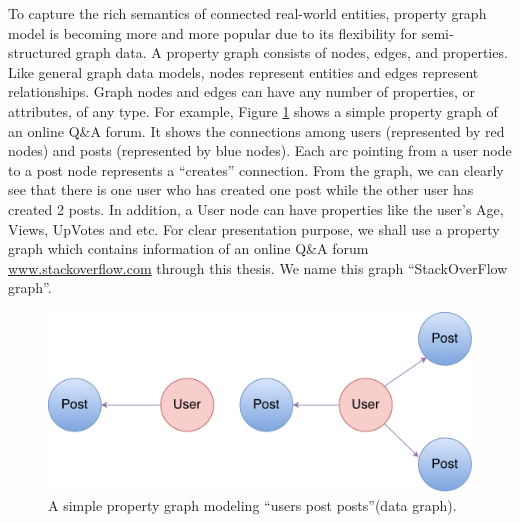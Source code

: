 To capture the rich semantics of connected real-world entities, property graph model \cite{DBLP:conf/mtsr/Tomaszuk16} is becoming more and more popular due to its flexibility for semi-structured graph data. A property graph consists of nodes, edges, and properties. Like general graph data models, nodes represent entities and edges represent relationships. Graph nodes and edges can have any number of properties, or attributes, of any type. For example, Figure \ref{fig:1} shows a simple property graph of an online Q\&A forum. It shows the connections among users (represented by red nodes) and posts (represented by blue nodes). Each arc pointing from a user node  to a post node represents a ``creates'' connection. From the graph, we can clearly see that  there is one user who has created one post while the other user has created 2 posts. In addition, a User node can have properties like the user’s Age, Views, UpVotes and etc. 
For clear presentation purpose, we shall use a property graph which contains information of an online Q\&A forum \url{www.stackoverflow.com} through this thesis. We name this graph ``StackOverFlow graph''.


\begin{figure}
	\centering
	\includegraphics[scale=0.38]{pic/11.pdf}
	\caption{A simple property graph modeling ``users post posts''(data graph).}
	\label{fig:1}
\end{figure}






